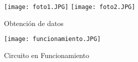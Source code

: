 \documentclass[10pt,a4paper]{article}
\begin{document}
\begin{figure}[H]
\centering
\texttt{[image: foto1.JPG]}
\texttt{[image: foto2.JPG]}
 \caption{Obtención de datos} 
\end{figure} 

\begin{figure}[H]
\centering
\texttt{[image: funcionamiento.JPG]}
 \caption{Circuito en Funcionamiento} 
\end{figure} 


\end{document}
